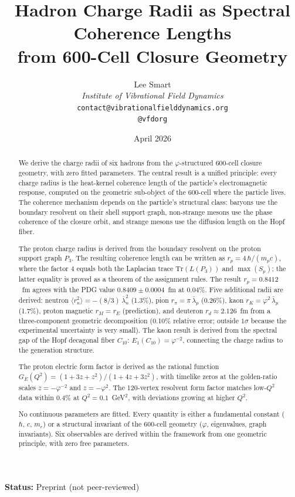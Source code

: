 \documentclass[12pt]{article}
\title{Hadron Charge Radii as Spectral Coherence Lengths\\[6pt]
\large from 600-Cell Closure Geometry}
\author{%
  Lee Smart\\[4pt]
  \textit{Institute of Vibrational Field Dynamics}\\[2pt]
  \texttt{contact@vibrationalfielddynamics.org}\\[2pt]
  \texttt{@vfd\textunderscore org}%
}
\date{April 2026}
\newcommand{\phig}{\varphi}
\newcommand{\lbar}{\bar{\lambda}}
\begin{document}
\maketitle

\noindent\textbf{Status:} Preprint (not peer-reviewed)

\begin{abstract}
We derive the charge radii of six hadrons from the $\phig$-structured 600-cell closure geometry, with zero fitted parameters. The central result is a unified principle: every charge radius is the heat-kernel coherence length of the particle's electromagnetic response, computed on the geometric sub-object of the 600-cell where the particle lives. The coherence mechanism depends on the particle's structural class: baryons use the boundary resolvent on their shell support graph, non-strange mesons use the phase coherence of the closure orbit, and strange mesons use the diffusion length on the Hopf fiber.

The proton charge radius is derived from the boundary resolvent on the proton support graph $P_3$. The resulting coherence length can be written as $r_p = 4\,\hbar/(m_p c)$, where the factor $4$ equals both the Laplacian trace $\mathrm{Tr}(L(P_3))$ and $\max(S_p)$; the latter equality is proved as a theorem of the assignment rules. The result $r_p = 0.8412$~fm agrees with the PDG value $0.8409 \pm 0.0004$~fm at 0.04\%. Five additional radii are derived: neutron $\langle r_n^2 \rangle = -(8/3)\,\lbar_n^2$ (1.3\%), pion $r_\pi = \pi\,\lbar_p$ (0.26\%), kaon $r_K = \phig^2\,\lbar_p$ (1.7\%), proton magnetic $r_M = r_E$ (prediction), and deuteron $r_d \approx 2.126$~fm from a three-component geometric decomposition (0.10\% relative error; outside $1\sigma$ because the experimental uncertainty is very small). The kaon result is derived from the spectral gap of the Hopf decagonal fiber $C_{10}$: $E_1(C_{10}) = \phig^{-2}$, connecting the charge radius to the generation structure.

The proton electric form factor is derived as the rational function $G_E(Q^2) = (1+3z+z^2)/(1+4z+3z^2)$, with timelike zeros at the golden-ratio scales $z = -\phig^{-2}$ and $z = -\phig^2$. The 120-vertex resolvent form factor matches low-$Q^2$ data within 0.4\% at $Q^2 = 0.1$~GeV$^2$, with deviations growing at higher $Q^2$.

No continuous parameters are fitted. Every quantity is either a fundamental constant ($\hbar$, $c$, $m_e$) or a structural invariant of the 600-cell geometry ($\phig$, eigenvalues, graph invariants). Six observables are derived within the framework from one geometric principle, with zero free parameters.
\end{abstract}
\end{document}
